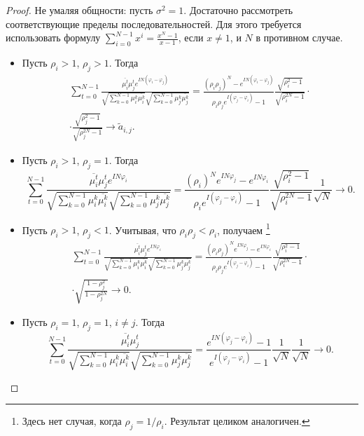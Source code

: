 \documentclass[12pt,a4paper]{article}
\begin{document}
	\begin{proof}
		Не умаляя общности: пусть $\sigma^2 = 1$. Достаточно рассмотреть соответствующие пределы последовательностей. Для этого требуется использовать формулу $\sum_{i = 0}^{N-1} x^i = \frac{x^N-1}{x-1}$, если $x \ne 1$, и $N$ в противном случае.
		\begin{itemize}
			\item Пусть $\rho_i > 1$, $\rho_j > 1$. Тогда
			\begin{multline*}
			\sum_{t=0}^{N-1} \frac{\overline{\mu_i^t} \mu_j^t e^{I N (\varphi_i - \varphi_j)}}{\sqrt{\sum_{k=0}^{N-1} \mu_i^k \overline{\mu_i^k}} \sqrt{\sum_{k=0}^{N-1} \mu_j^k \overline{\mu_j^k}}} = \frac{(\rho_i \rho_j)^N - e^{I N(\varphi_i - \varphi_j)}}{\rho_i \rho_j e^{I (\varphi_j - \varphi_i)} - 1} \frac{\sqrt{\rho_i^2 - 1}}{\sqrt{\rho_i^{2N} - 1}} \cdot \\ \cdot \frac{\sqrt{\rho_j^2 - 1}}{\sqrt{\rho_j^{2N} - 1}} \to \tilde a_{i, j}.
			\end{multline*}
			
			\item Пусть $\rho_i > 1$, $\rho_j = 1$. Тогда
			\begin{equation*}
			\sum_{t=0}^{N-1} \frac{\overline{\mu_i^t} \mu_j^t e^{I N \varphi_i}}{\sqrt{\sum_{k=0}^{N-1} \mu_i^k \overline{\mu_i^k}} \sqrt{\sum_{k=0}^{N-1} \mu_j^k \overline{\mu_j^k}}} = \frac{(\rho_i )^N e^{I N \varphi_j} - e^{I N \varphi_i}}{\rho_i e^{I (\varphi_j - \varphi_i)} - 1} \frac{\sqrt{\rho_i^2 - 1}}{\sqrt{\rho_i^{2N} - 1}} \frac{1}{\sqrt{N}} \to 0.
			\end{equation*}
			
			\item Пусть $\rho_i > 1$, $\rho_j < 1$. Учитывая, что $\rho_i \rho_j < \rho_i$, получаем \footnote{Здесь нет случая, когда $\rho_j = 1/\rho_i$. Результат целиком аналогичен.}
			\begin{multline*}
			\sum_{t=0}^{N-1} \frac{\overline{\mu_i^t} \mu_j^t e^{I N \varphi_i}}{\sqrt{\sum_{k=0}^{N-1} \mu_i^k \overline{\mu_i^k}} \sqrt{\sum_{k=0}^{N-1} \mu_j^k \overline{\mu_j^k}}} = \frac{(\rho_i \rho_j)^N e^{I N \varphi_j} - e^{I N \varphi_i}}{\rho_i \rho_j e^{I (\varphi_j - \varphi_i)} - 1} \frac{\sqrt{\rho_i^2 - 1}}{\sqrt{\rho_i^{2N} - 1}} \cdot \\ \cdot \sqrt{\frac{1 - \rho_j^2}{1 - \rho_j^{2N}}} \to 0.
			\end{multline*}
			
			\item Пусть $\rho_i = 1$, $\rho_j = 1$, $i \ne j$. Тогда
			\begin{equation*}
			\sum_{t=0}^{N-1} \frac{\overline{\mu_i^t} \mu_j^t}{\sqrt{\sum_{k=0}^{N-1} \mu_i^k \overline{\mu_i^k}} \sqrt{\sum_{k=0}^{N-1} \mu_j^k \overline{\mu_j^k}}} = \frac{e^{I N (\varphi_j -\varphi_i)} - 1}{e^{I (\varphi_j - \varphi_i)} - 1} \frac{1}{\sqrt{N}} \frac{1}{\sqrt{N}} \to 0.
			\end{equation*}
			

\end{itemize}
\end{proof}
\end{document}
